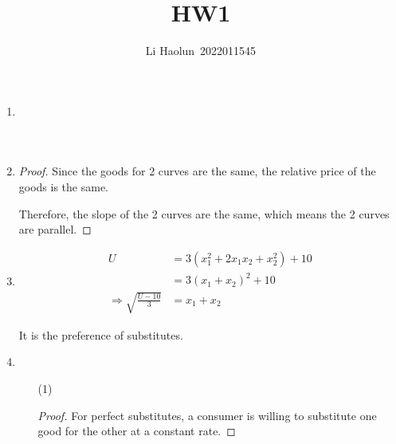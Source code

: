 \documentclass{article}
\title{HW1}
\author{Li Haolun\ 2022011545}
\begin{document}
\maketitle
\begin{enumerate}
    \item \leavevmode\vadjust{\vspace{-\baselineskip}}\newline
    \begin{figure}[!h]
        \centering
    \end{figure}
    \item \begin{proof}
        Since the goods for 2 curves are the same, the relative price of the goods is the same.\par
        Therefore, the slope of the 2 curves are the same, which means the 2 curves are parallel.
    \end{proof}
    \item 
    \begin{equation}
        \begin{aligned}
            U
            &=3(x_1^2+2x_1x_2+x_2^2)+10 \\
            &=3(x_1+x_2)^2+10 \\
            \Rightarrow\sqrt{\frac{U-10}{3}}
            &=x_1+x_2
        \end{aligned} \nonumber
    \end{equation}
    \begin{figure}[!h]
        \centering
    \end{figure}\par
    It is the preference of substitutes.
    \item \begin{enumerate}
        \item[(1)] \begin{proof}
            For perfect substitutes, a consumer is willing to substitute one good for the other at a constant rate.\par

\end{proof}
\end{enumerate}
\end{enumerate}
\end{document}
